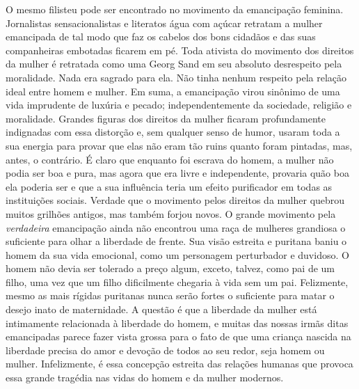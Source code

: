 O mesmo filisteu pode ser encontrado no movimento da emancipação
feminina. Jornalistas sensacionalistas e literatos água com açúcar
retratam a mulher emancipada de tal modo que faz os cabelos dos bons
cidadãos e das suas companheiras embotadas ficarem em pé. Toda ativista
do movimento dos direitos da mulher é retratada como uma Georg Sand em
seu absoluto desrespeito pela moralidade. Nada era sagrado para ela. Não
tinha nenhum respeito pela relação ideal entre homem e mulher. Em suma,
a emancipação virou sinônimo de uma vida imprudente de luxúria e pecado;
independentemente da sociedade, religião e moralidade. Grandes figuras
dos direitos da mulher ficaram profundamente indignadas com essa
distorção e, sem qualquer senso de humor, usaram toda a sua energia para
provar que elas não eram tão ruins quanto foram pintadas, mas, antes, o
contrário. É claro que enquanto foi escrava do homem, a mulher não podia
ser boa e pura, mas agora que era livre e independente, provaria quão
boa ela poderia ser e que a sua influência teria um efeito purificador
em todas as instituições sociais. Verdade que o movimento pelos direitos
da mulher quebrou muitos grilhões antigos, mas também forjou novos. O
grande movimento pela \emph{verdadeira} emancipação ainda não encontrou
uma raça de mulheres grandiosa o suficiente para olhar a liberdade de
frente. Sua visão estreita e puritana baniu o homem da sua vida
emocional, como um personagem perturbador e duvidoso. O homem não devia
ser tolerado a preço algum, exceto, talvez, como pai de um filho, uma
vez que um filho dificilmente chegaria à vida sem um pai. Felizmente,
mesmo as mais rígidas puritanas nunca serão fortes o suficiente para
matar o desejo inato de maternidade. A questão é que a liberdade da
mulher está intimamente relacionada à liberdade do homem, e muitas das
nossas irmãs ditas emancipadas parece fazer vista grossa para o fato de
que uma criança nascida na liberdade precisa do amor e devoção de todos
ao seu redor, seja homem ou mulher. Infelizmente, é essa concepção
estreita das relações humanas que provoca essa grande tragédia nas vidas
do homem e da mulher modernos.

